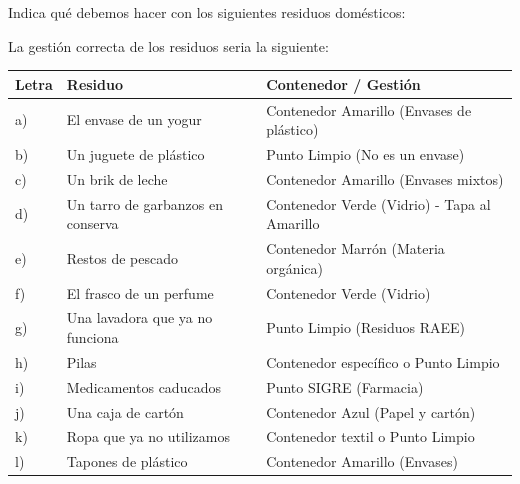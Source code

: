 {
	Indica qué debemos hacer con los siguientes residuos domésticos:\\
}

\begin{solution}

	La gestión correcta de los residuos seria la siguiente:\\

	\begin{tabularx}{\linewidth}{|>{\hsize}Y|>{\hsize}Y|>{\hsize}Y|}
		\hline
		\textbf{Letra} & \textbf{Residuo}                  & \textbf{Contenedor / Gestión}                \\
		\hline
		a)             & El envase de un yogur             & Contenedor Amarillo (Envases de plástico)    \\
		\hline
		b)             & Un juguete de plástico            & Punto Limpio (No es un envase)               \\
		\hline
		c)             & Un brik de leche                  & Contenedor Amarillo (Envases mixtos)         \\
		\hline
		d)             & Un tarro de garbanzos en conserva & Contenedor Verde (Vidrio) - Tapa al Amarillo \\
		\hline
		e)             & Restos de pescado                 & Contenedor Marrón (Materia orgánica)         \\
		\hline
		f)             & El frasco de un perfume           & Contenedor Verde (Vidrio)                    \\
		\hline
		g)             & Una lavadora que ya no funciona   & Punto Limpio (Residuos RAEE)                 \\
		\hline
		h)             & Pilas                             & Contenedor específico o Punto Limpio         \\
		\hline
		i)             & Medicamentos caducados            & Punto SIGRE (Farmacia)                       \\
		\hline
		j)             & Una caja de cartón                & Contenedor Azul (Papel y cartón)             \\
		\hline
		k)             & Ropa que ya no utilizamos         & Contenedor textil o Punto Limpio             \\
		\hline
		l)             & Tapones de plástico               & Contenedor Amarillo (Envases)                \\
		\hline
	\end{tabularx}

\end{solution}



